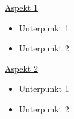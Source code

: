 
\underline{Aspekt 1}
\begin{itemize}
  \item Unterpunkt 1
  \item Unterpunkt 2
\end{itemize}\vspace{10pt}

\underline{Aspekt 2}
\begin{itemize}
  \item Unterpunkt 1
  \item Unterpunkt 2
\end{itemize}\vspace{10pt}


\newpage